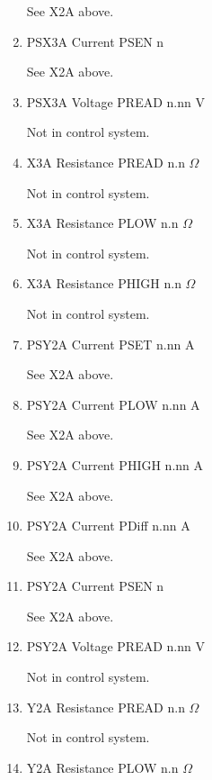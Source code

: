 \documentclass[11pt]{book}		%
\begin{document}
\begin{enumerate}
\color{red}
See X2A above.
\color{black}

 \item PSX3A Current PSEN  n

\color{red}
See X2A above.
\color{black}

 \item PSX3A Voltage PREAD n.nn V

\color{red}
Not in control system.
\color{black}

 \item X3A Resistance PREAD n.n $\Omega$

\color{red}
Not in control system.
\color{black}

 \item X3A Resistance PLOW n.n $\Omega$

\color{red}
Not in control system.
\color{black}

 \item X3A Resistance PHIGH n.n $\Omega$

\color{red}
Not in control system.
\color{black}

 \item PSY2A Current PSET  n.nn A

\color{red}
See X2A above.
\color{black}

 \item PSY2A Current PLOW  n.nn A

\color{red}
See X2A above.
\color{black}

 \item PSY2A Current PHIGH n.nn A

\color{red}
See X2A above.
\color{black}

 \item PSY2A Current PDiff n.nn A

\color{red}
See X2A above.
\color{black}

 \item PSY2A Current PSEN  n

\color{red}
See X2A above.
\color{black}

 \item PSY2A Voltage PREAD n.nn V

\color{red}
Not in control system.
\color{black}

 \item Y2A Resistance PREAD n.n $\Omega$

\color{red}
Not in control system.
\color{black}

 \item Y2A Resistance PLOW n.n $\Omega$


\end{enumerate}
\end{document}
